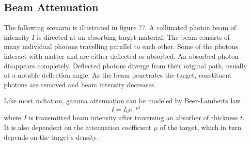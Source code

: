 \subsection{Beam Attenuation}
The following scenario is illustrated in figure ??. A collimated photon beam of intensity $I$ is directed at an absorbing target material. The beam consists of many individual photons travelling parallel to each other. Some of the photons interact with matter and are either deflected or absorbed. An absorbed photon disappears completely. Deflected photons diverge from their original path, usually at a notable deflection angle. As the beam penetrates the target, constituent photons are removed and beam intensity decreases.

Like most radiation, gamma attenuation can be modeled by Beer-Lamberts law
    \begin{equation}
    I=I_0 e^{-μt}
    \end{equation}
where $I$ is transmitted beam intensity after traversing an absorber of thickness $t$. It is also dependent on the attenuation coefficient $\mu$ of the target, which in turn depends on the target’s density.

